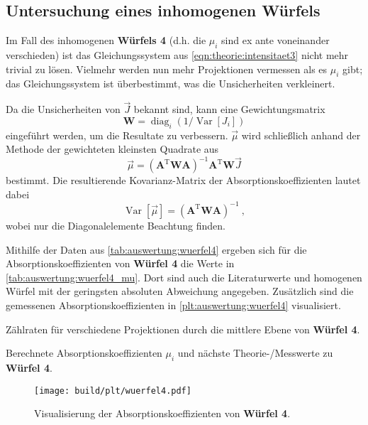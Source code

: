 \subsection{Untersuchung eines inhomogenen Würfels} \label{sec:auswertung:wuerfel4}
Im Fall des inhomogenen \textbf{Würfels 4}
(d.h. die $\mu_i$ sind ex ante voneinander verschieden)
ist das Gleichungssystem aus \ref{eqn:theorie:intensitaet3} nicht mehr trivial zu lösen.
Vielmehr werden nun mehr Projektionen vermessen als es $\mu_i$ gibt;
das Gleichungssystem ist überbestimmt,
was die Unsicherheiten verkleinert.

\def\A{\symbf{A}}
\def\W{\symbf{W}}
\def\T{\mathrm{T}}

Da die Unsicherheiten von $\vec{J}$ bekannt sind,
kann eine Gewichtungsmatrix
\[ \symbf{W} = \operatorname{diag}_i (1 / \operatorname{Var}[J_i]) \]
eingeführt werden,
um die Resultate zu verbessern.
$\vec{\mu}$ wird schließlich anhand der Methode der gewichteten kleinsten Quadrate aus
\begin{equation*}
    \vec{\mu} = (\A^\T \W \A)^{-1} \A^\T \W \vec{J}
\end{equation*}
bestimmt.
Die resultierende Kovarianz-Matrix der Absorptionskoeffizienten lautet dabei
\begin{equation*}
    \operatorname{Var}[\vec{\mu}] = (\A^\T \W \A)^{-1} \ ,
\end{equation*}
wobei nur die Diagonalelemente Beachtung finden.

Mithilfe der Daten aus \autoref{tab:auswertung:wuerfel4}
ergeben sich für die Absorptionskoeffizienten von \textbf{Würfel 4}
die Werte in \autoref{tab:auswertung:wuerfel4_mu}.
Dort sind auch die Literaturwerte und homogenen Würfel mit der geringsten absoluten Abweichung angegeben.
Zusätzlich sind die gemessenen Absorptionskoeffizienten in \autoref{plt:auswertung:wuerfel4} visualisiert.


\begin{table}[H]
    \centering
    \caption{Zählraten für verschiedene Projektionen durch die mittlere Ebene von \textbf{Würfel 4}.}
    \label{tab:auswertung:wuerfel4}
\end{table}

\begin{table}[H]
    \centering
    \caption{Berechnete Absorptionskoeffizienten $\mu_i$ und nächste Theorie-/Messwerte zu \textbf{Würfel 4}.}
    \label{tab:auswertung:wuerfel4_mu}
\end{table}

\begin{figure}
    \centering
    \texttt{[image: build/plt/wuerfel4.pdf]}
    \caption{Visualisierung der Absorptionskoeffizienten von \textbf{Würfel 4}.}
    \label{plt:auswertung:wuerfel4}
\end{figure}
